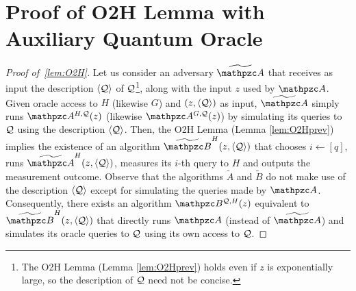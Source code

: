 
\ifnum{}
\section{Proof of O2H Lemma with Auxiliary Quantum Oracle}\label{appsec:O2H_oracle}
\else
\fi
\begin{proof}[Proof of~\cref{lem:O2H}]
Let us consider an adversary $\widetilde{\qA}$ that receives as input
the description $\langle \mathcal{Q}\rangle$ of $\mathcal{Q}$\footnote{The O2H Lemma (Lemma \ref{lem:O2Hprev}) holds even if $z$ is exponentially large, so the description of $\mathcal{Q}$ need not be concise.}, along with the input
$z$ used by $\qA$. Given oracle access to $H$ (likewise $G$) and $(z,
\langle \mathcal{Q}\rangle)$ as input, $\widetilde{\qA}$ simply runs
$\qA^{H, \cQ}(z)$ (likewise $\qA^{G, \cQ}(z)$) by simulating its queries to $\mathcal{Q}$
using the description $\langle \mathcal{Q}\rangle$. Then, the O2H Lemma (Lemma
\ref{lem:O2Hprev}) implies the existence of an algorithm
$\widetilde{\qB}^{H}(z, \langle \cQ\rangle)$ that chooses $i \gets
[q]$, runs $\widetilde{\qA}^H(z, \langle \cQ\rangle)$, measures its
$i$-th query to $H$ and outputs the measurement outcome. Observe that
the algorithms $\widetilde{A}$ and $\widetilde{B}$ do not make use of
the description $\langle \mathcal{Q}\rangle$ except for simulating the queries
made by $\qA$.  Consequently, there exists an algorithm
$\qB^{\cQ, H}(z)$ equivalent to $\widetilde{\qB}^{H}(z, \langle \cQ\rangle)$ that directly runs $\qA$ (instead of $\widetilde{\qA}$)
and simulates its oracle queries to $\mathcal{Q}$ using its own access to
$\mathcal{Q}$.
\end{proof}
